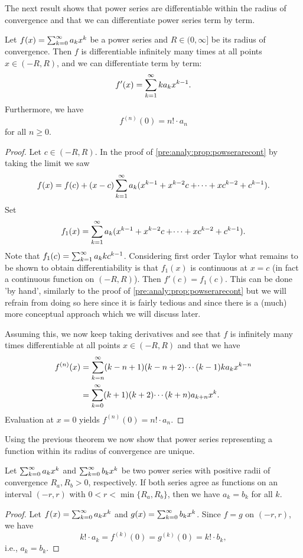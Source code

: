 \documentclass[10pt, a4paper]{article}
\newcommand{\infsumo}{\infsum[k = 0]}
\begin{document}
The next result shows that power series are differentiable within the radius of convergence and that we can differentiate power series term by term.

\begin{theorem}\label{pre:analy:thm:funcofpowseriesinfdiff}
    Let $f(x) = \infsumo a_kx ^ k$ be a power series and $R \in (0, \infty]$ be its radius of convergence.
    Then $f$ is differentiable infinitely many times at all points $x \in (-R, R)$,
    and we can differentiate term by term:
    \[
    f'(x) = \sum_{k = 1}^{\infty} ka_kx ^ {k - 1}.
    \]
    Furthermore,
    we have
    \[
    f ^ {(n)}(0) = n! \cdot a_n
    \]
    for all $n \geq 0$.
    \begin{proof}
        Let $c \in (-R, R)$.
        In the proof of \autoref{pre:analy:prop:powserarecont} by taking the limit we saw
        \[
        f(x) = f(c) + (x - c)\sum_{k = 1}^{\infty} a_k(x ^ {k - 1} + x ^ {k - 2}c + \dotsi + xc ^ {k - 2} + c ^ {k - 1}).
        \]
        Set
        \[
        f_1(x) = \sum_{k = 1}^{\infty} a_k(x ^ {k - 1} + x ^ {k - 2}c + \dotsi + xc ^ {k - 2} + c ^ {k - 1}).
        \]
         Note that $f_1(c) = \sum_{k = 1}^{\infty} a_kkc ^ {k - 1}$.
         Considering first order Taylor what remains to be shown to obtain differentiability is that $f_1(x)$ is continuous at $x = c$
         (in fact a continuous function on $(-R, R)$).
         Then $f'(c) = f_1(c)$.
         This can be done 'by hand',
         similarly to the proof of \autoref{pre:analy:prop:powserarecont} but we will refrain from doing so here since it is fairly tedious and since there is a
         (much)
         more conceptual approach which we will discuss later.

         Assuming this,
         we now keep taking derivatives and see that $f$ is infinitely many times differentiable at all points $x \in (-R, R)$ and that we have
         \begin{align*}
             f ^ {(n)}(x) &= \infsum[k = n](k - n + 1)(k - n + 2)\dotsi(k - 1)ka_kx ^ {k - n} \\
             &= \infsumo(k + 1)(k + 2)\dotsi(k + n)a_{k + n}x ^ k.
         \end{align*}
         Evaluation at $x = 0$ yields $f ^ {(n)}(0) = n! \cdot a_n$.
    \end{proof}
\end{theorem}

Using the previous theorem we now show that power series representing a function within its radius of convergence are unique.
\begin{theorem}
    Let $\infsumo a_kx ^ k$ and $\infsumo b_kx ^ k$ be two power series with positive radii of convergence $R_a, R_b > 0$,
    respectively.
    If both series agree as functions on an interval $(-r, r)$ with $0 < r < \min\{R_a, R_b\}$,
    then we have $a_k = b_k$ for all $k$.
    \begin{proof}
        Let $f(x) = \infsumo a_kx ^ k$ and $g(x) = \infsumo b_kx ^ k$.
        Since $f = g$ on $(-r, r)$,
        we have
        \[
        k! \cdot a_k = f ^ {(k)}(0) = g ^ {(k)}(0) = k! \cdot b_k,
        \]
        i.e.,
        $a_k = b_k$.
    \end{proof}
\end{theorem}
\end{document}
